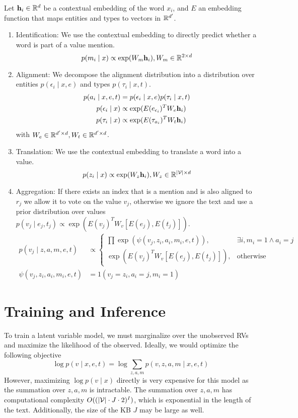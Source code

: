 \documentclass[12pt]{article}
\begin{document}
Let $\mathbf{h}_i \in \mathbb{R}^d$ be a contextual embedding of the word $x_i$,
and $E$ an embedding function that maps entities and types to vectors in $\mathbb{R}^{d'}$.
\begin{enumerate}
\item Identification: We use the contextual embedding to directly predict
whether a word is part of a value mention.
$$p(m_i \mid x) \propto \exp(W_m\mathbf{h}_i), W_m \in \mathbb{R}^{2 \times d}$$
\item Alignment: We decompose the alignment distribution into a distribution over
entities $p(\epsilon_i \mid x,e)$ and types $p(\tau_i \mid x,t)$.
\begin{align*}
p(a_i \mid x,e,t) &= p(\epsilon_i \mid x,e)p(\tau_i \mid x,t)\\
p(\epsilon_i \mid x) &\propto \exp(E(e_{\epsilon_i})^T W_e \mathbf{h}_i)\\
p(\tau_i \mid x) &\propto \exp(E(\tau_{a_i})^T W_t \mathbf{h}_i)
\end{align*}
with $W_e \in \mathbb{R}^{d' \times d},W_t \in \mathbb{R}^{d' \times d}$.
\item Translation: We use the contextual embedding to translate a word
into a value.
$$p(z_i \mid x) \propto \exp(W_z \mathbf{h}_i), W_z \in \mathbb{R}^{|\mathcal{V}| \times d}$$
\item Aggregation:
If there exists an index that is a mention and is also aligned to $r_j$
we allow it to vote on the value $v_j$, otherwise we ignore the text
and use a prior distribution over values
$p(v_j \mid e_j, t_j) \propto \exp(E(v_j)^TW_v [E(e_j),E(t_j)])$.
\begin{align*}
p(v_j \mid z,a,m,e,t) &\propto \begin{cases}
    \prod \exp(\psi(v_j, z_i,a_i,m_i,e,t)),  & \exists i, m_i = 1 \wedge a_i = j\\
    \exp(E(v_j)^TW_v [E(e_j),E(t_j)]), & \textrm{otherwise}
\end{cases}\\
\psi(v_j, z_i, a_i, m_i,e,t) &= 1(v_j = z_i, a_i = j, m_i=1)%
\end{align*}
\end{enumerate}

\section{Training and Inference}
To train a latent variable model, we must marginalize over the unobserved RVs
and maximize the likelihood of the observed.
Ideally, we would optimize the following objective
\begin{equation}
\log p(v \mid x,e,t) = \log \sum_{z,a,m} p(v,z,a,m \mid x,e,t)
\end{equation}
However, maximizing $\log p(v \mid x)$ directly is very expensive for this model
as the summation over $z,a,m$ is intractable.
The summation over $z,a,m$ has computational complexity $O((|\mathcal{V}|\cdot J\cdot 2)^{I})$,
which is exponential in the length of the text.
Additionally, the size of the KB $J$ may be large as well.
\end{document}
